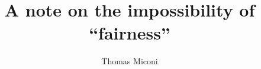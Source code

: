 \documentclass[twocolumn]{article}
\begin{document}





\title{A note on the impossibility of ``fairness''}

\author{Thomas Miconi}

\maketitle
\end{document}
